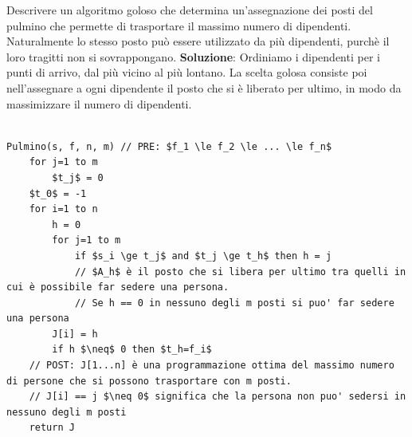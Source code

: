 Descrivere un algoritmo goloso che determina un'assegnazione dei posti del pulmino che permette di trasportare il massimo numero di dipendenti. Naturalmente lo stesso posto può essere utilizzato da più dipendenti, purchè il loro tragitti non si sovrappongano.
\linebreak[2]
\textbf{Soluzione}: Ordiniamo i dipendenti per i punti di arrivo, dal più vicino al più lontano. La scelta golosa consiste poi nell'assegnare a ogni dipendente il posto che si è liberato per ultimo, in modo da massimizzare il numero di dipendenti.

\begin{lstlisting}[mathescape=true,caption=Algoritmo goloso del pulmino]

Pulmino(s, f, n, m) // PRE: $f_1 \le f_2 \le ... \le f_n$
	for j=1 to m
		$t_j$ = 0
	$t_0$ = -1
	for i=1 to n
		h = 0
		for j=1 to m
			if $s_i \ge t_j$ and $t_j \ge t_h$ then h = j
			// $A_h$ è il posto che si libera per ultimo tra quelli in cui è possibile far sedere una persona.
			// Se h == 0 in nessuno degli m posti si puo' far sedere una persona
		J[i] = h
		if h $\neq$ 0 then $t_h=f_i$
	// POST: J[1...n] è una programmazione ottima del massimo numero di persone che si possono trasportare con m posti.
	// J[i] == j $\neq 0$ significa che la persona non puo' sedersi in nessuno degli m posti
	return J

\end{lstlisting}
